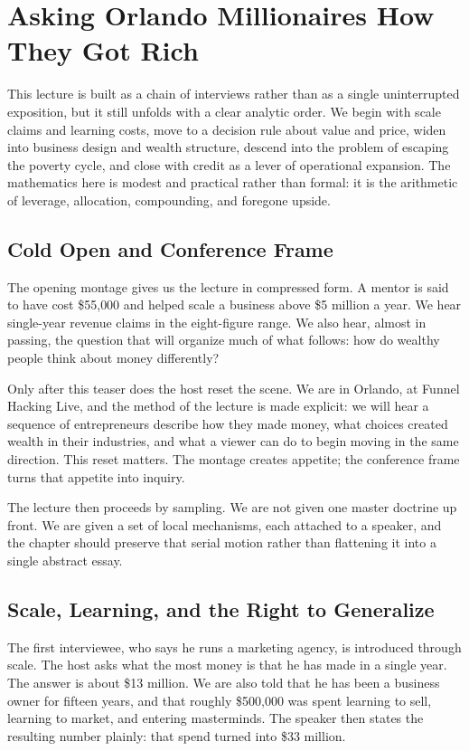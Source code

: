 \chapter{Asking Orlando Millionaires How They Got Rich}

This lecture is built as a chain of interviews rather than as a single uninterrupted exposition, but it still unfolds with a clear analytic order. We begin with scale claims and learning costs, move to a decision rule about value and price, widen into business design and wealth structure, descend into the problem of escaping the poverty cycle, and close with credit as a lever of operational expansion. The mathematics here is modest and practical rather than formal: it is the arithmetic of leverage, allocation, compounding, and foregone upside.

\section{Cold Open and Conference Frame}

The opening montage gives us the lecture in compressed form. A mentor is said to have cost \$55{,}000 and helped scale a business above \$5 million a year. We hear single-year revenue claims in the eight-figure range. We also hear, almost in passing, the question that will organize much of what follows: how do wealthy people think about money differently?

Only after this teaser does the host reset the scene. We are in Orlando, at Funnel Hacking Live, and the method of the lecture is made explicit: we will hear a sequence of entrepreneurs describe how they made money, what choices created wealth in their industries, and what a viewer can do to begin moving in the same direction. This reset matters. The montage creates appetite; the conference frame turns that appetite into inquiry.

The lecture then proceeds by sampling. We are not given one master doctrine up front. We are given a set of local mechanisms, each attached to a speaker, and the chapter should preserve that serial motion rather than flattening it into a single abstract essay.

\section{Scale, Learning, and the Right to Generalize}

The first interviewee, who says he runs a marketing agency, is introduced through scale. The host asks what the most money is that he has made in a single year. The answer is about \$13 million. We are also told that he has been a business owner for fifteen years, and that roughly \$500{,}000 was spent learning to sell, learning to market, and entering masterminds. The speaker then states the resulting number plainly: that spend turned into \$33 million.

